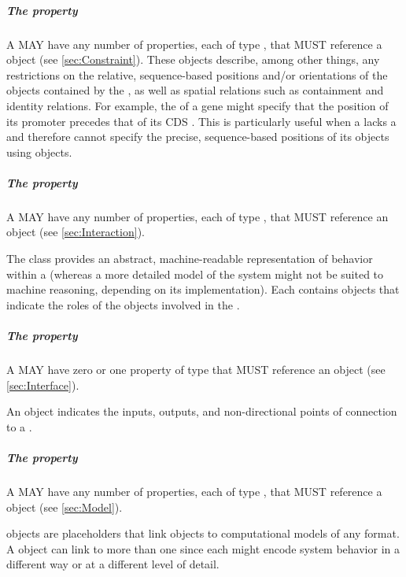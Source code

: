 \subparagraph{The  property}
\label{sec:hasConstraint}

A  MAY have any number of  properties, each of type , that MUST reference a  object (see \ref{sec:Constraint}).  
These objects describe, among other things, any restrictions on the relative, sequence-based positions and/or orientations of the  objects contained by the , as well as spatial relations such as containment and identity relations.
For example, the  of a gene might specify that the position of its promoter  precedes that of its CDS . This is particularly useful when a  lacks a  and therefore cannot specify the precise, sequence-based positions of its  objects using  objects.

\subparagraph{The  property}\label{sec:hasInteraction}

A  MAY have any number of  properties, each of type , that MUST reference an  object (see \ref{sec:Interaction}).  

The  class provides an abstract, machine-readable representation of behavior within a  (whereas a more detailed model of the system might not be suited to machine reasoning, depending on its implementation).
Each  contains  objects that indicate the roles of the  objects involved in the .

\subparagraph{The  property}\label{sec:hasInterface}

A  MAY have zero or one  property of type  that MUST reference an  object (see \ref{sec:Interface}).  

An  object indicates the inputs, outputs, and non-directional points of connection to a .

\subparagraph{The  property}\label{sec:hasModel}

A  MAY have any number of  properties, each of type , that MUST reference a  object (see \ref{sec:Model}).  

 objects are placeholders that link  objects to computational models of any format.
A  object can link to more than one  since each might encode system behavior in a different way or at a different level of detail.














